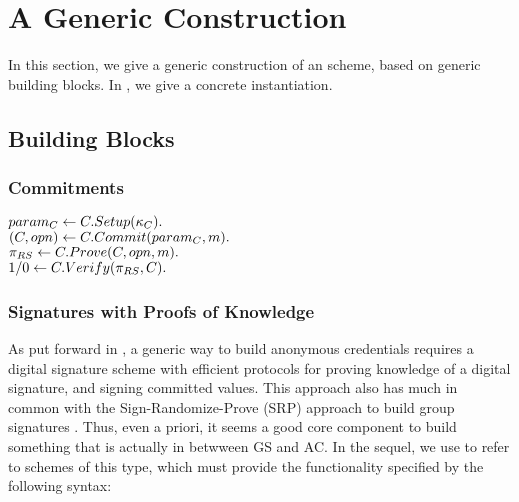 \section{A Generic \UAS Construction}
\label{sec:gen-construction}

In this section, we give a generic construction of an \UAS scheme, based on
generic building blocks. In , we give a concrete
instantiation.

\subsection{Building Blocks}
\label{ssec:bblocks}

\subsubsection{Commitments}


\begin{description}
  \item[$param_C \gets C.Setup(\kappa_{C}).$]
  \item[$(C,opn) \gets C.Commit(param_C,m).$] 
  \item[$\pi_{RS} \gets C.Prove(C,opn,m).$]    
  \item[$1/0 \gets C.Verify(\pi_{RS},C).$] 
\end{description}

\subsubsection{Signatures with Proofs of Knowledge}

As put forward in \cite{cl02}, a generic way to build anonymous credentials
requires a digital signature scheme with efficient protocols for proving
knowledge of a digital signature, and signing committed values. This approach
also has much in common with the Sign-Randomize-Prove (SRP) approach to build
group signatures \needcite. Thus, even a priori, it seems a good core component
to build something that is actually in betwween GS and AC. In the sequel, we use
\RS to refer to schemes of this type, which must provide the functionality
specified by the following syntax:

